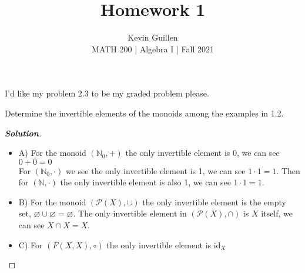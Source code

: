 \documentclass[11pt]{article}
\newenvironment{problem}[2][Problem\!]{\begin{trivlist}
\item[\hskip \labelsep {\bfseries #1}\hskip \labelsep {\bfseries #2}]}{\end{trivlist}}
\newenvironment{solution}{\begin{proof}[\textbf{\textit{Solution}}] }{\end{proof}}
\newcommand{\nn}{\mathbb N}   %
\renewcommand{\emptyset}{\varnothing}
\begin{document}
 
\title{Homework 1}
\author{Kevin Guillen\\[0.5em]
MATH 200 | Algebra I | Fall 2021}
\date{} 
\maketitle

I'd like my problem 2.3 to be my graded problem please.


\begin{tcolorbox}
\begin{problem}{1.1} Determine the invertible elements of the monoids among the examples in 1.2. 
\end{problem}
\end{tcolorbox}
    \begin{solution}$ $ \\
        \begin{itemize}
            \item{A)} For the monoid $(\nn_0, +)$ the only invertible element is 0, we can see $0 + 0 = 0$
            \\ For $(\nn_0, \cdot)$ we see the only invertible element is 1, we can see $1 \cdot 1 = 1$. Then for $(\nn, \cdot )$ the only invertible element is also 1, we can see $1 \cdot 1 = 1$.

            \item{B)} For the monoid $(\mathcal{P}(X), \cup)$ the only invertible element is the empty set, $\emptyset \cup \emptyset = \emptyset$. The only invertible element in $(\mathcal{P}(X), \cap)$ is $X$ itself, we can see $X \cap X = X$.

            \item{C)} For $(F(X,X), \circ)$ the only invertible element is $\text{id}_X$
        \end{itemize}
    \end{solution}
\end{document}
